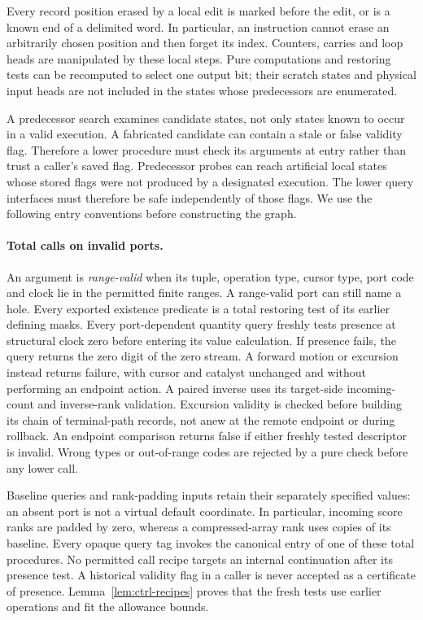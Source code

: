 \documentclass[11pt]{article}
\numberwithin{equation}{section}
\theoremstyle{definition}
\theoremstyle{remark}
\begin{document}
Every record position erased by a local edit is marked before the edit,
or is a known end of a delimited word.  In particular, an instruction
cannot erase an arbitrarily chosen position and then forget its index.
Counters, carries and loop heads are manipulated by these local steps.
Pure computations and restoring tests can be recomputed to select one
output bit; their scratch states and physical input heads are not
included in the states whose predecessors are enumerated.

A predecessor search examines candidate states, not only states known to occur in a valid execution. A fabricated candidate can contain a stale or false validity flag. Therefore a lower procedure must check its arguments at entry rather than trust a caller's saved flag. Predecessor probes can reach artificial local states whose stored flags were not produced by a designated execution.  The lower query interfaces
must therefore be safe independently of those flags.  We use the
following entry conventions before constructing the graph.

\paragraph{Total calls on invalid ports.}
An argument is \emph{range-valid} when its tuple, operation type,
cursor type, port code and clock lie in the permitted finite ranges.
A range-valid port can still name a hole. Every exported existence
predicate is a total restoring test of its earlier defining masks.
Every port-dependent quantity query freshly tests presence at structural
clock zero before entering its value calculation. If presence fails,
the query returns the zero digit of the zero stream. A forward motion
or excursion instead returns failure, with cursor and catalyst unchanged
and without performing an endpoint action. A paired inverse uses its
target-side incoming-count and inverse-rank validation. Excursion
validity is checked before building its chain of terminal-path records, not anew at the
remote endpoint or during rollback. An endpoint comparison returns
false if either freshly tested descriptor is invalid. Wrong types or
out-of-range codes are rejected by a pure check before any lower call.

Baseline queries and rank-padding inputs retain their separately
specified values: an absent port is not a virtual default coordinate.
In particular, incoming score ranks are padded by zero, whereas a
compressed-array rank uses copies of its baseline. Every opaque query
tag invokes the canonical entry of one of these total procedures.
No permitted call recipe targets an internal continuation after its
presence test. A historical validity flag in a caller is never accepted
as a certificate of presence. Lemma~\ref{lem:ctrl-recipes} proves that
the fresh tests use earlier operations and fit the allowance bounds.
\end{document}
